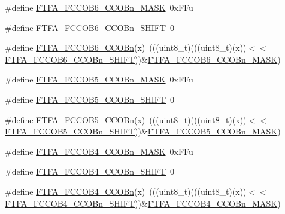 \begin{DoxyCompactItemize}
\item 
\#define \hyperlink{group___f_t_f_a___register___masks_ga35746ac0168b284ea3f29b1b6f47d932}{F\+T\+F\+A\+\_\+\+F\+C\+C\+O\+B6\+\_\+\+C\+C\+O\+Bn\+\_\+\+M\+A\+SK}~0x\+F\+Fu
\item 
\#define \hyperlink{group___f_t_f_a___register___masks_gaf859b028e8f5d2dfdbaed9aeccc6c66c}{F\+T\+F\+A\+\_\+\+F\+C\+C\+O\+B6\+\_\+\+C\+C\+O\+Bn\+\_\+\+S\+H\+I\+FT}~0
\item 
\#define \hyperlink{group___f_t_f_a___register___masks_ga4c7674945e3f13c18ff9af0a27bf3340}{F\+T\+F\+A\+\_\+\+F\+C\+C\+O\+B6\+\_\+\+C\+C\+O\+Bn}(x)~(((uint8\+\_\+t)(((uint8\+\_\+t)(x))$<$$<$\hyperlink{group___f_t_f_a___register___masks_gaf859b028e8f5d2dfdbaed9aeccc6c66c}{F\+T\+F\+A\+\_\+\+F\+C\+C\+O\+B6\+\_\+\+C\+C\+O\+Bn\+\_\+\+S\+H\+I\+FT}))\&\hyperlink{group___f_t_f_a___register___masks_ga35746ac0168b284ea3f29b1b6f47d932}{F\+T\+F\+A\+\_\+\+F\+C\+C\+O\+B6\+\_\+\+C\+C\+O\+Bn\+\_\+\+M\+A\+SK})
\item 
\#define \hyperlink{group___f_t_f_a___register___masks_ga6112d953d0c0527ada279726c9b0c5a3}{F\+T\+F\+A\+\_\+\+F\+C\+C\+O\+B5\+\_\+\+C\+C\+O\+Bn\+\_\+\+M\+A\+SK}~0x\+F\+Fu
\item 
\#define \hyperlink{group___f_t_f_a___register___masks_ga632fbfd380fcb5f46e4388b4edb490b2}{F\+T\+F\+A\+\_\+\+F\+C\+C\+O\+B5\+\_\+\+C\+C\+O\+Bn\+\_\+\+S\+H\+I\+FT}~0
\item 
\#define \hyperlink{group___f_t_f_a___register___masks_ga3eb812983637d422754d6c71bc37636f}{F\+T\+F\+A\+\_\+\+F\+C\+C\+O\+B5\+\_\+\+C\+C\+O\+Bn}(x)~(((uint8\+\_\+t)(((uint8\+\_\+t)(x))$<$$<$\hyperlink{group___f_t_f_a___register___masks_ga632fbfd380fcb5f46e4388b4edb490b2}{F\+T\+F\+A\+\_\+\+F\+C\+C\+O\+B5\+\_\+\+C\+C\+O\+Bn\+\_\+\+S\+H\+I\+FT}))\&\hyperlink{group___f_t_f_a___register___masks_ga6112d953d0c0527ada279726c9b0c5a3}{F\+T\+F\+A\+\_\+\+F\+C\+C\+O\+B5\+\_\+\+C\+C\+O\+Bn\+\_\+\+M\+A\+SK})
\item 
\#define \hyperlink{group___f_t_f_a___register___masks_ga42b1625323567bb015cf90601b468433}{F\+T\+F\+A\+\_\+\+F\+C\+C\+O\+B4\+\_\+\+C\+C\+O\+Bn\+\_\+\+M\+A\+SK}~0x\+F\+Fu
\item 
\#define \hyperlink{group___f_t_f_a___register___masks_ga22245895591851bc7a547b2fe5464b63}{F\+T\+F\+A\+\_\+\+F\+C\+C\+O\+B4\+\_\+\+C\+C\+O\+Bn\+\_\+\+S\+H\+I\+FT}~0
\item 
\#define \hyperlink{group___f_t_f_a___register___masks_ga3392c0d338eb61be4e67f0b4a720b06e}{F\+T\+F\+A\+\_\+\+F\+C\+C\+O\+B4\+\_\+\+C\+C\+O\+Bn}(x)~(((uint8\+\_\+t)(((uint8\+\_\+t)(x))$<$$<$\hyperlink{group___f_t_f_a___register___masks_ga22245895591851bc7a547b2fe5464b63}{F\+T\+F\+A\+\_\+\+F\+C\+C\+O\+B4\+\_\+\+C\+C\+O\+Bn\+\_\+\+S\+H\+I\+FT}))\&\hyperlink{group___f_t_f_a___register___masks_ga42b1625323567bb015cf90601b468433}{F\+T\+F\+A\+\_\+\+F\+C\+C\+O\+B4\+\_\+\+C\+C\+O\+Bn\+\_\+\+M\+A\+SK})
$$
\end{DoxyCompactItemize}
